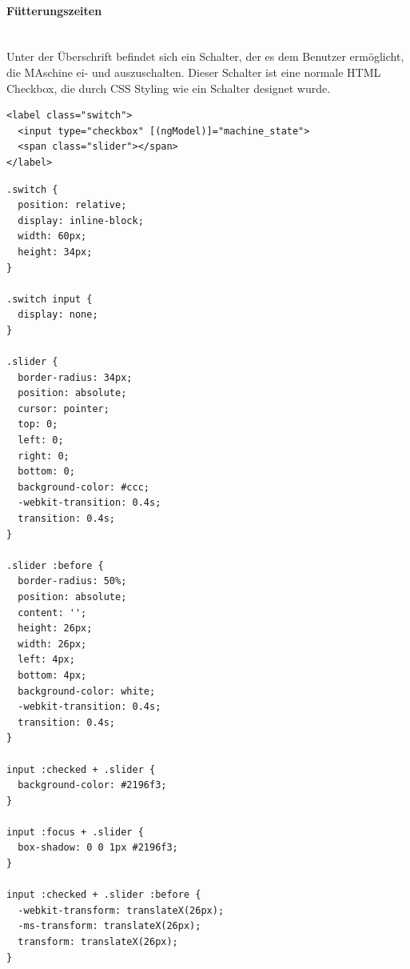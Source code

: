 \paragraph*{Fütterungszeiten}\mbox{}\\
Unter der Überschrift befindet sich ein Schalter, der es dem Benutzer ermöglicht, die MAschine ei- und auszuschalten. Dieser Schalter ist eine normale \ac{HTML} Checkbox, die durch \ac{CSS} Styling wie ein Schalter designet wurde.

\begin{lstlisting}[caption=HTML Schalter,label=html-schalter,style=HTML]
<label class="switch">
  <input type="checkbox" [(ngModel)]="machine_state">
  <span class="slider"></span>
</label>
\end{lstlisting}

\begin{lstlisting}[caption=CSS Schalter,label=css-schalter,style=css]
.switch {
  position: relative;
  display: inline-block;
  width: 60px;
  height: 34px;
}

.switch input {
  display: none;
}

.slider {
  border-radius: 34px;
  position: absolute;
  cursor: pointer;
  top: 0;
  left: 0;
  right: 0;
  bottom: 0;
  background-color: #ccc;
  -webkit-transition: 0.4s;
  transition: 0.4s;
}

.slider :before {
  border-radius: 50%;
  position: absolute;
  content: '';
  height: 26px;
  width: 26px;
  left: 4px;
  bottom: 4px;
  background-color: white;
  -webkit-transition: 0.4s;
  transition: 0.4s;
}

input :checked + .slider {
  background-color: #2196f3;
}

input :focus + .slider {
  box-shadow: 0 0 1px #2196f3;
}

input :checked + .slider :before {
  -webkit-transform: translateX(26px);
  -ms-transform: translateX(26px);
  transform: translateX(26px);
}
\end{lstlisting}

